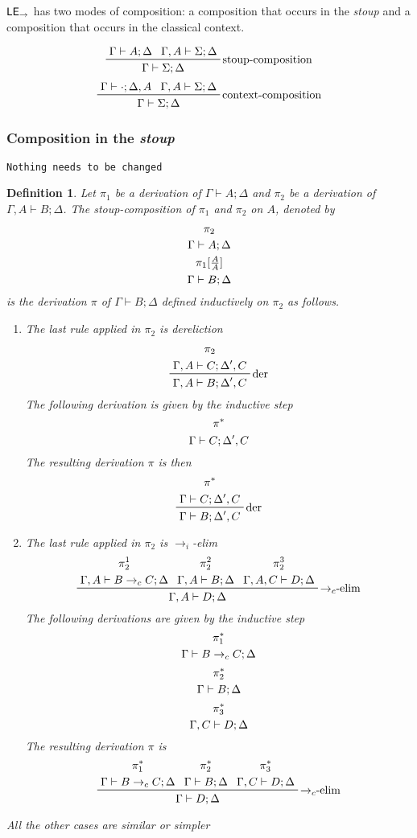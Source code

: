 \documentclass{article}
\newcommand{\lei}{$\text{\sffamily{LE}}_{\to}$}
\newcommand{\stoup}{\emph{stoup}}
\newcommand{\efc}{$\to_c$-elim}
\newcommand{\efi}{$\to_i$-elim}
\newcommand{\ifc}{$\to_c$-int}
\newcommand{\comp}[1]{[\tfrac{#1}{#1}]}
\newtheorem{definition}{Definition}[section]
\begin{document}
\lei{} has two modes of composition: a composition that occurs in the \stoup{} and a composition that occurs in the classical context.

\[\prftree[r]{stoup-composition}{\Gamma\vdash A; \Delta}{\Gamma, A\vdash\Sigma; \Delta}{\Gamma\vdash\Sigma; \Delta}\]
\[\prftree[r]{context-composition}{\Gamma\vdash \cdot; \Delta, A}{\Gamma, A\vdash\Sigma; \Delta}{\Gamma\vdash\Sigma; \Delta}\]

\subsubsection{Composition in the \stoup{}}
\texttt{Nothing needs to be changed}

\begin{definition}
  Let $\pi_1$ be a derivation of $\Gamma\vdash A; \Delta$ and $\pi_2$ be a derivation of $\Gamma, A\vdash B; \Delta$. The \emph{stoup-composition} of $\pi_1$ and $\pi_2$ on $A$, denoted by
  \[\prftree[noline]{\prftree[noline]{\prftree[noline]{\pi_2}{\Gamma\vdash A; \Delta}}{\pi_1\comp{A}}}{\Gamma\vdash B; \Delta}\]
  is the derivation $\pi$ of $\Gamma\vdash B; \Delta$ defined inductively on $\pi_2$ as follows.

  \begin{enumerate}
  \item %
      The last rule applied in $\pi_2$ is dereliction \[\prftree[r]{der}{\prftree[noline]{\pi_2}{\Gamma, A\vdash C; \Delta', C}}{\Gamma, A\vdash B;\Delta', C}\]
      The following derivation is given by the inductive step \[\prftree[noline]{\pi^*}{\Gamma\vdash C; \Delta', C}\]
      The resulting derivation $\pi$ is then \[\prftree[r]{der}{\prftree[noline]{\pi^*}{\Gamma\vdash C; \Delta', C}}{\Gamma\vdash B;\Delta', C }\]%
    
  \item The last rule applied in $\pi_2$ is \efi{} \[\prftree[r]{\efc}{\prftree[noline]{\pi_2^1}{\Gamma, A\vdash B\to_c C; \Delta}}{\prftree[noline]{\pi_2^2}{\Gamma, A\vdash B; \Delta}}{\prftree[noline]{\pi_2^3}{\Gamma, A, C\vdash D; \Delta}}{\Gamma, A\vdash D;\Delta}\]
    The following derivations are given by the inductive step
    \[\prftree[noline]{\pi_1^*}{\Gamma\vdash B\to_c C; \Delta}\]
    \[\prftree[noline]{\pi_2^*}{\Gamma\vdash B; \Delta}\]
    \[\prftree[noline]{\pi_3^*}{\Gamma, C\vdash D; \Delta}\]
    The resulting derivation $\pi$ is
    \[\prftree[r]{\efc}{
        \prftree[noline]{\pi_1^*}{\Gamma\vdash B\to_c C; \Delta}}{
        \prftree[noline]{\pi_2^*}{\Gamma\vdash B; \Delta}}{
        \prftree[noline]{\pi_3^*}{\Gamma, C\vdash D; \Delta}}{
        \Gamma\vdash D;\Delta}
    \]
  \end{enumerate}
  All the other cases are similar or simpler
\end{definition}
\end{document}
